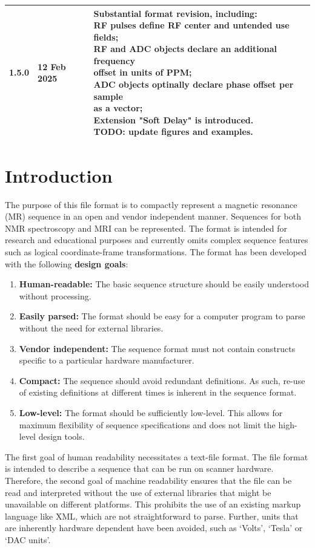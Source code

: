 \documentclass{article}
\begin{document}
\begin{tabular}{lll}
1.5.0 & 12 Feb 2025 & \makecell{Substantial format revision, including: \\
RF pulses define RF center and untended use fields; \\
RF and ADC objects declare an additional frequency \\ offset in units of PPM; \\
ADC objects optinally declare phase offset per sample \\ as a vector; \\
Extension "Soft Delay" is introduced. \\
TODO: update figures and examples.  \\
} \\
\bottomrule
\end{tabular}


\section{Introduction}
The purpose of this file format is to compactly represent a magnetic resonance (MR) sequence in an open and vendor independent manner. Sequences for both NMR spectroscopy and MRI can be represented. The format is intended for research and educational purposes and currently omits complex sequence features such as logical coordinate-frame transformations. The format has been developed with the following \textbf{design goals}:
\begin{enumerate}
\item \textbf{Human-readable:} The basic sequence structure should be easily understood without processing.
\item \textbf{Easily parsed:} The format should be easy for a computer program to parse without the need for external libraries.
\item \textbf{Vendor independent:} The sequence format must not contain constructs specific to a particular hardware manufacturer.
\item \textbf{Compact:} The sequence should avoid redundant definitions. As such, re-use of existing definitions at different times is inherent in the sequence format.
\item \textbf{Low-level:} The format should be sufficiently low-level. This allows for maximum flexibility of sequence specifications and does not limit the high-level design tools.
\end{enumerate}

The first goal of human readability necessitates a text-file format. The file format is intended to describe a sequence that can be run on scanner hardware. Therefore, the second goal of machine readability ensures that the file can be read and interpreted without the use of external libraries that might be unavailable on different platforms. This prohibits the use of an existing markup language like XML, which are not straightforward to parse. Further, units  that are inherently hardware dependent have been avoided, such as `Volts', `Tesla' or  `DAC units'. 
\end{document}

